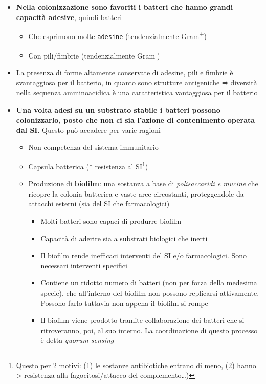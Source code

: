 \documentclass[italian,]{article}
\providecommand{\tightlist}{%
  \setlength{\itemsep}{0pt}\setlength{\parskip}{0pt}}
\begin{document}
\begin{itemize}
\tightlist
\item
  \textbf{Nella colonizzazione sono favoriti i batteri che hanno grandi
  capacità adesive}, quindi batteri

  \begin{itemize}
  \tightlist
  \item
    Che esprimono molte \texttt{adesine} (tendenzialmente
    Gram\textsuperscript{+})
  \item
    Con pili/fimbrie (tendenzialmente Gram\textsuperscript{-})
  \end{itemize}
\item
  La presenza di forme altamente conservate di adesine, pili e fimbrie è
  svantaggiosa per il batterio, in quanto sono strutture antigeniche ⇒
  diversità nella sequenza amminoacidica è una caratteristica
  vantaggiosa per il batterio
\item
  \textbf{Una volta adesi su un substrato stabile i batteri possono
  colonizzarlo, posto che non ci sia l'azione di contenimento operata
  dal SI}. Questo può accadere per varie ragioni

  \begin{itemize}
  \tightlist
  \item
    Non competenza del sistema immunitario
  \item
    Capsula batterica (↑ resistenza al SI\footnote{Questo per 2 motivi:
      (1) le sostanze antibiotiche entrano di meno, (2) hanno
      \textgreater{} resistenza alla fagocitosi/attacco del
      complemento\ldots{})})
  \item
    Produzione di \textbf{biofilm}: una sostanza a base di
    \emph{polisaccaridi e mucine} che ricopre la colonia batterica e
    vaste aree circostanti, proteggendole da attacchi esterni (sia del
    SI che farmacologici)

    \begin{itemize}
    \tightlist
    \item
      Molti batteri sono capaci di produrre biofilm
    \item
      Capacità di aderire sia a substrati biologici che inerti
    \item
      Il biofilm rende inefficaci interventi del SI e/o farmacologici.
      Sono necessari interventi specifici
    \item
      Contiene un ridotto numero di batteri (non per forza della
      medesima specie), che all'interno del biofilm non possono
      replicarsi attivamente. Possono farlo tuttavia non appena il
      biofilm si rompe
    \item
      Il biofilm viene prodotto tramite collaborazione dei batteri che
      si ritroveranno, poi, al suo interno. La coordinazione di questo
      processo è detta \emph{quorum sensing}
    \end{itemize}
  \end{itemize}
\end{itemize}
\end{document}
